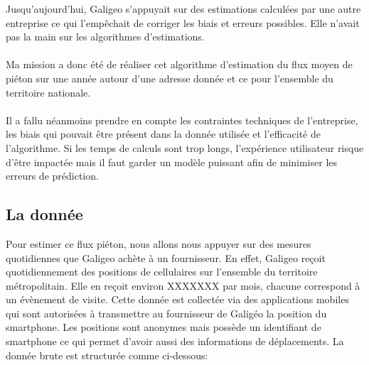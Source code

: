 Jusqu’aujourd’hui, Galigeo s’appuyait sur des estimations calculées par une autre entreprise ce qui l’empêchait de corriger les biais et erreurs possibles. Elle n’avait pas la main sur les algorithmes d’estimations.

\paragraph*{}

Ma mission a donc été de réaliser cet algorithme d’estimation du flux moyen de piéton sur une année autour d’une adresse donnée et ce pour l'ensemble du territoire nationale.

\paragraph{}

Il a fallu néanmoins prendre en compte les contraintes techniques de l’entreprise, les biais qui pouvait être présent dans la donnée utilisée et l’efficacité de l’algorithme. Si les temps de calculs sont trop longs, l’expérience utilisateur risque d’être impactée mais il faut garder un modèle puissant afin de minimiser les erreurs de prédiction.

\subsection{La donnée}

Pour estimer ce flux piéton, nous allons nous appuyer sur des mesures quotidiennes que Galigeo achète à un fournisseur. En effet, Galigeo reçoit quotidiennement des positions de cellulaires sur l'ensemble du territoire métropolitain. Elle en reçoit environ XXXXXXX par mois, chacune correspond à un évènement de visite. Cette donnée est collectée via des applications mobiles qui sont autorisées à transmettre au fournisseur de Galigéo la position du smartphone. Les positions sont anonymes mais possède un identifiant de smartphone ce qui permet d'avoir aussi des informations de déplacements. La donnée brute est structurée comme ci-dessous:

